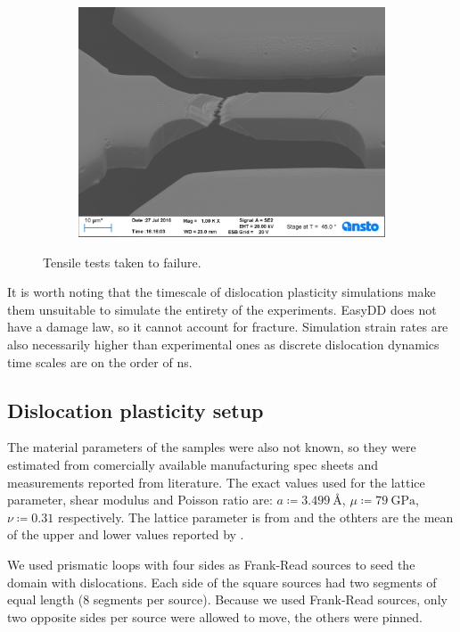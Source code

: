 \begin{figure}
\begin{subfigure}[t]{0.3\linewidth}
        \includegraphics[width=\linewidth]{../data/Ni039.jpg}
    \end{subfigure}
    \caption{Tensile tests taken to failure.}
    \label{f:tensileFailure}
\end{figure}

It is worth noting that the timescale of dislocation plasticity simulations make them unsuitable to simulate the entirety of the experiments. EasyDD does not have a damage law, so it cannot account for fracture. Simulation strain rates are also necessarily higher than experimental ones as discrete dislocation dynamics time scales are on the order of \si{\nano\second}.

\subsection{Dislocation plasticity setup}
\label{ss:modelSetup}

The material parameters of the samples were also not known, so they were estimated from comercially available manufacturing spec sheets and measurements reported from literature. The exact values used for the lattice parameter, shear modulus and Poisson ratio are: $a \coloneqq \SI{3.499}{\angstrom}$, $ \mu  \coloneqq \SI{79}{\giga\pascal}$, $\nu \coloneqq 0.31$ respectively. The lattice parameter is from \cite{ni_lattice} and the othters are the mean of the upper and lower values reported by \cite{azom_nickel}.

We used prismatic loops with four sides as Frank-Read sources to seed the domain with dislocations. Each side of the square sources had two segments of equal length (8 segments per source). Because we used Frank-Read sources, only two opposite sides per source were allowed to move, the others were pinned.

